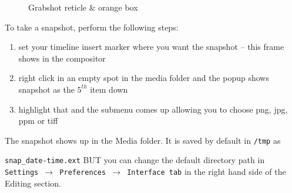 \begin{figure}[htpb]
\begin{minipage}{.49\linewidth}
    \caption{Grabshot reticle \& orange box}
    \label{fig:grabshot_recticle}
    \end{minipage}
\end{figure}

To take a snapshot, perform the following steps:

\begin{enumerate}
    \item set your timeline insert marker where you want the snapshot -- this frame shows in the compositor
    \item  right click in an empty spot in the media folder and the popup shows snapshot as the $5^{th}$ item down
    \item  highlight that and the submenu comes up allowing you to choose png, jpg, ppm or tiff
\end{enumerate}

The snapshot shows up in the Media folder.  
It is saved by default in \texttt{/tmp} as

\texttt{snap\_date-time.ext} BUT you can change the default directory path in \texttt{Settings $\rightarrow$ Preferences $\rightarrow$ Interface tab} in the right hand side of the Editing section.

